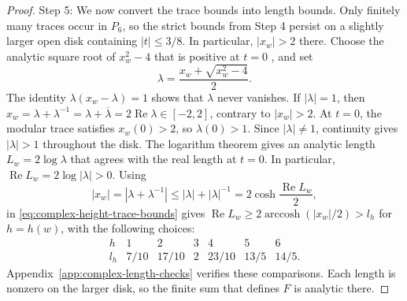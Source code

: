 \documentclass[10pt,twoside]{article}
\theoremstyle{plain}
\theoremstyle{definition}
\theoremstyle{remark}
\DeclareMathOperator{\arccosh}{arccosh}
\begin{document}
\begin{proof}
Step 5: We now convert the trace bounds into length bounds.
Only finitely many traces occur in $P_6$, so the strict bounds
from Step 4 persist on a slightly larger open disk containing
$|t|\leq3/8$. In particular, $|x_w|>2$ there.
Choose the analytic square root of $x_w^2-4$ that is positive
at $t=0$ \cite[Theorem~6.2, p.~100]{SteinShakarchi}, and set
$$
\lambda=\frac{x_w+\sqrt{x_w^2-4}}2.
$$
The identity $\lambda(x_w-\lambda)=1$ shows that $\lambda$ never
vanishes. If $|\lambda|=1$, then
$x_w=\lambda+\lambda^{-1}=\lambda+\overline{\lambda}=2\operatorname{Re}\lambda\in[-2,2]$,
contrary to $|x_w|>2$.
At $t=0$, the modular trace satisfies $x_w(0)>2$, so $\lambda(0)>1$.
Since $|\lambda|\neq 1$, continuity gives $|\lambda|>1$
throughout the disk.
The logarithm theorem
\cite[Theorem~6.2, p.~100]{SteinShakarchi} gives an analytic length
$L_w=2\log\lambda$ that agrees with the real length at $t=0$.
In particular, $\operatorname{Re}L_w=2\log|\lambda|>0$.
Using
$$
|x_w|=|\lambda+\lambda^{-1}|\leq|\lambda|+|\lambda|^{-1}
=2\cosh\frac{\operatorname{Re}L_w}{2},
$$
in \eqref{eq:complex-height-trace-bounds} gives
$\operatorname{Re}L_w\geq2\arccosh(|x_w|/2)>l_h$ for $h=h(w)$,
with the following choices:
\begin{equation}
\label{eq:complex-length-lower-bounds}
\begin{array}{c|rrrrrr}
h&1&2&3&4&5&6\\
\hline
l_h&7/10&17/10&2&23/10&13/5&14/5.
\end{array}
\end{equation}
Appendix~\ref{app:complex-length-checks} verifies these comparisons.
Each length is nonzero on the larger disk, so the finite sum
that defines $F$ is analytic there.
\end{proof}
\end{document}
